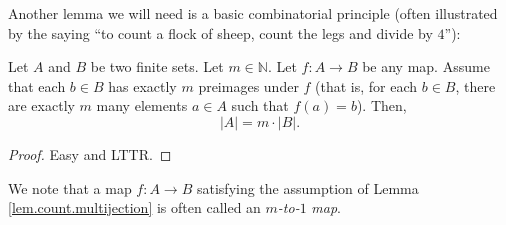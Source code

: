 Another lemma we will need is a basic combinatorial principle (often
illustrated by the saying \textquotedblleft to count a flock of sheep, count
the legs and divide by $4$\textquotedblright):

\begin{lemma}
\label{lem.count.multijection}Let $A$ and $B$ be two
finite sets. Let $m\in\mathbb{N}$. Let $f:A\rightarrow B$ be any map. Assume
that each $b\in B$ has exactly $m$ preimages under $f$ (that is, for each
$b\in B$, there are exactly $m$ many elements $a\in A$ such that $f\left(
a\right)  =b$). Then,%
\[
\left\vert A\right\vert =m\cdot\left\vert B\right\vert .
\]

\end{lemma}

\begin{proof}
Easy and LTTR.
\end{proof}

We note that a map $f:A\rightarrow B$ satisfying the assumption of Lemma
\ref{lem.count.multijection} is often called an $m$\emph{-to-}$1$\emph{ map}.


